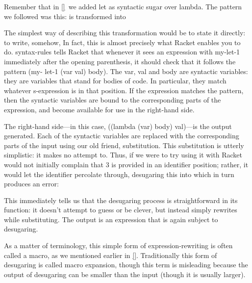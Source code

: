 
Remember that in \ref{}\ we added let as syntactic sugar over lambda. The
pattern we followed was this:
is transformed into


The simplest way of describing this transformation would be to state it
directly: to write, somehow,
In fact, this is almost precisely what Racket enables you to do.
syntax-rules tells Racket that whenever it sees an expression with my-let-1
immediately after the opening parenthesis, it should check that it follows the
pattern (my- let-1 (var val) body). The var, val and body are syntactic
variables: they are variables that stand for bodies of code. In particular, they
match whatever s-expression is in that position. If the expression matches the
pattern, then the syntactic variables are bound to the corresponding parts of
the expression, and become available for use in the right-hand side.

The right-hand side—in this case, ((lambda (var) body) val)—is the output
generated. Each of the syntactic variables are replaced with the corresponding
parts of the input using our old friend, substitution. This substitution is
utterly simplistic: it makes no attempt to. Thus, if we were to try using it
with
Racket would not initially complain that 3 is provided in an identifier
position; rather, it would let the identifier percolate through, desugaring this
into
which in turn produces an error:

This immediately tells us that the desugaring process is straightforward in its
function: it doesn’t attempt to guess or be clever, but instead simply rewrites
while substituting. The output is an expression that is again subject to
desugaring.

As a matter of terminology, this simple form of expression-rewriting is often
called a macro, as we mentioned earlier in \ref{}. Traditionally this form of
desugaring is called macro expansion, though this term is misleading because the
output of desugaring can be smaller than the input (though it is usually
larger).

